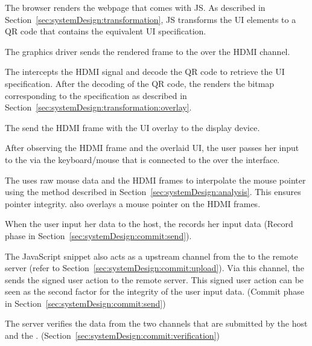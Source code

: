 \begin{mylist}
  \item[\one] The browser renders the webpage that comes with \name JS. As described in Section~\ref{sec:systemDesign:transformation}, \name JS transforms the UI elements to a QR code that contains the equivalent UI specification.
  \item[\two] The graphics driver sends the rendered frame to the \device over the HDMI channel.
  \item[\three] The \device intercepts the HDMI signal and decode the QR code to retrieve the UI specification. After the decoding of the QR code, the \device renders the bitmap corresponding to the specification as described in Section~\ref{sec:systemDesign:transformation:overlay}.
  \item[\four] The \device send the HDMI frame with the UI overlay to the display device.
  \item[\five] After observing the HDMI frame and the overlaid UI, the user passes her input to the \device via the keyboard/mouse that is connected to the \device over the \usb interface.
  \item[\six] The \device uses raw mouse data and the HDMI frames to interpolate the mouse pointer using the method described in Section~\ref{sec:systemDesign:analysis}. This ensures pointer integrity. \device also overlays a mouse pointer on the HDMI frames.
  \item[\seven] When the user input her data to the host, the \device records her input data (Record phase in Section~\ref{sec:systemDesign:commit:send}).
  \item[\eight] The \name JavaScript snippet also acts as a upstream channel from the \device to the remote server (refer to Section~\ref{sec:systemDesign:commit:upload}). Via this channel, the \device sends the signed user action to the remote server. This signed user action can be seen as the second factor for the integrity of the user input data. (Commit phase in Section~\ref{sec:systemDesign:commit:send})
  \item [\nine] The server verifies the data from the two channels that are submitted by the host and the \device. (Section~\ref{sec:systemDesign:commit:verification})
\end{mylist}



\iffalse
\begin{figure}[h]
\centering
\texttt{[image: inputPrivacy.pdf]}
\caption{Input Confidentiality}
\label{fig:inputPrivacy}
\centering
\end{figure}
\fi




